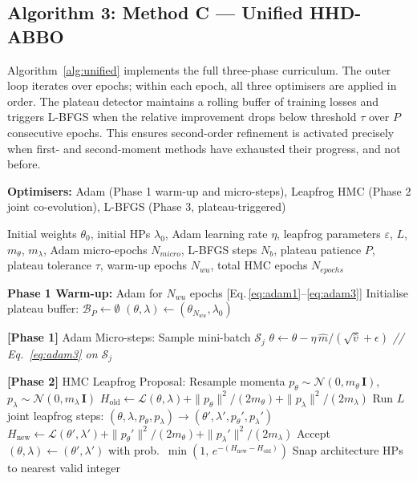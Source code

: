 \documentclass[11pt]{article}
\begin{document}
\subsection{Algorithm 3: Method C — Unified HHD-ABBO}

Algorithm~\ref{alg:unified} implements the full three-phase curriculum.
The outer loop iterates over epochs; within each epoch, all three
optimisers are applied in order.  The plateau detector maintains a
rolling buffer of training losses and triggers L-BFGS when the relative
improvement drops below threshold $\tau$ over $P$ consecutive epochs.
This ensures second-order refinement is activated precisely when first-
and second-moment methods have exhausted their progress, and not before.

\begin{algorithm}[H]
\caption{Method C — Unified HHD-ABBO}
\label{alg:unified}
\textbf{Optimisers:} Adam (Phase 1 warm-up and micro-steps),
Leapfrog HMC (Phase 2 joint co-evolution),
L-BFGS (Phase 3, plateau-triggered)
\begin{algorithmic}[1]
\Require Initial weights $\theta_0$, initial HPs $\lambda_0$,
         Adam learning rate $\eta$,
         leapfrog parameters $\varepsilon$, $L$, $m_\theta$, $m_\lambda$,
         Adam micro-epochs $N_{micro}$,
         L-BFGS steps $N_b$,
         plateau patience $P$,
         plateau tolerance $\tau$,
         warm-up epochs $N_{wu}$,
         total HMC epochs $N_{epochs}$

\State \textbf{Phase 1 Warm-up:} Adam for $N_{wu}$ epochs
       [Eq.\,\eqref{eq:adam1}--\eqref{eq:adam3}]
\State Initialise plateau buffer: $\mathcal{B}_P \leftarrow \emptyset$
\State $(\theta, \lambda) \leftarrow (\theta_{N_{wu}}, \lambda_0)$


  \State \textbf{[Phase 1]} Adam Micro-steps:
    \State Sample mini-batch $\mathcal{S}_j$
    \State $\theta \leftarrow \theta - \eta\,\hat{m} / (\sqrt{\hat{v}}+\epsilon)$
           \hfill \textit{// Eq.\ \eqref{eq:adam3} on $\mathcal{S}_j$}
  \EndFor

  \State \textbf{[Phase 2]} HMC Leapfrog Proposal:
  \State Resample momenta
         $p_\theta \sim \mathcal{N}(0, m_\theta\,\mathbf{I})$,
         $p_\lambda \sim \mathcal{N}(0, m_\lambda\,\mathbf{I})$
  \State $H_{\mathrm{old}} \leftarrow \mathcal{L}(\theta,\lambda)
         + \|p_\theta\|^2/(2m_\theta) + \|p_\lambda\|^2/(2m_\lambda)$
  \State Run $L$ joint leapfrog steps:
         $(\theta,\lambda,p_\theta,p_\lambda) \to
          (\theta',\lambda',p_\theta',p_\lambda')$
  \State $H_{\mathrm{new}} \leftarrow \mathcal{L}(\theta',\lambda')
         + \|p_\theta'\|^2/(2m_\theta) + \|p_\lambda'\|^2/(2m_\lambda)$
  \State Accept $(\theta,\lambda) \leftarrow (\theta',\lambda')$
         with prob.\ $\min(1,\,e^{-(H_{\mathrm{new}}-H_{\mathrm{old}})})$
  \State Snap architecture HPs to nearest valid integer


\end{algorithmic}
\end{algorithm}
\end{document}
